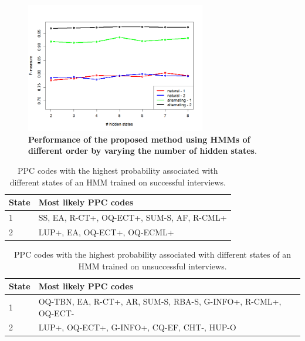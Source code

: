 \documentclass{amia_summit_2018}
\begin{document}
\begin{figure}[!htb]
    \centering
    \includegraphics[width=0.70\textwidth]{figures/hidden-states.png}
    \caption{\textbf{Performance of the proposed method using HMMs of different order by varying the number of hidden states}.}
    \label{fig:hidden-states}
\end{figure}

\begin{table}[!htb]
\centering
\caption{PPC codes with the highest probability associated with different states of an HMM trained on successful interviews.}
\label{tab:emission_matrix_s}
  \begin{tabular}{|l|l|}
  \hline
   \textbf{State} & \textbf{Most likely PPC codes} \\\hline 
1 & SS, EA, R-CT+, OQ-ECT+, SUM-S, AF, R-CML+ \\\hline           
2 & LUP+, EA, OQ-ECT+, OQ-ECML+  \\\hline    
  \end{tabular}
\end{table} 

\begin{table}[!htb]
\centering
\caption{PPC codes with the highest probability associated with different states of an HMM trained on unsuccessful interviews.}
\label{tab:emission_matrix_u}
  \begin{tabular}{|l|l|}
  \hline
   \textbf{State} & \textbf{Most likely PPC codes} \\\hline     
1 & OQ-TBN, EA, R-CT+, AR, SUM-S, RBA-S, G-INFO+, R-CML+, OQ-ECT- \\\hline
2 & LUP+, OQ-ECT+, G-INFO+, CQ-EF, CHT-, HUP-O \\\hline
  \end{tabular}
\end{table} 
\end{document}
